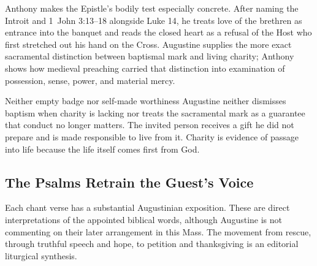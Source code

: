\begin{deepstudy}
Anthony makes the Epistle's bodily test especially concrete. After naming the Introit and 1~John 3:13--18 alongside Luke 14, he treats love of the brethren as entrance into the banquet and reads the closed heart as a refusal of the Host who first stretched out his hand on the Cross. Augustine supplies the more exact sacramental distinction between baptismal mark and living charity; Anthony shows how medieval preaching carried that distinction into examination of possession, sense, power, and material mercy.

\begin{massbox}{Neither empty badge nor self-made worthiness}
Augustine neither dismisses baptism when charity is lacking nor treats the sacramental mark as a guarantee that conduct no longer matters. The invited person receives a gift he did not prepare and is made responsible to live from it. Charity is evidence of passage into life because the life itself comes first from God.
\end{massbox}

\sectionguard
\subsection*{The Psalms Retrain the Guest's Voice\enspace{}}

Each chant verse has a substantial Augustinian exposition. These are direct interpretations of the appointed biblical words, although Augustine is not commenting on their later arrangement in this Mass. The movement from rescue, through truthful speech and hope, to petition and thanksgiving is an editorial liturgical synthesis.


\end{deepstudy}
